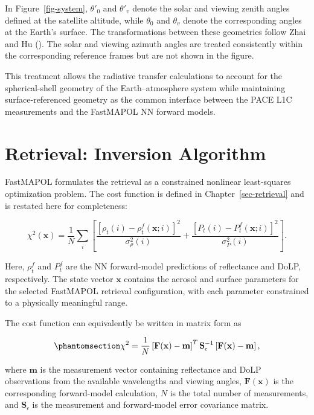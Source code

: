 \documentclass[
  11pt,
  letterpaper,
]{scrreprt}
\begin{document}
In Figure~\ref{fig-system}, \(\theta'_0\) and \(\theta'_v\) denote the
solar and viewing zenith angles defined at the satellite altitude, while
\(\theta_0\) and \(\theta_v\) denote the corresponding angles at the
Earth's surface. The transformations between these geometries follow
Zhai and Hu (). The solar and viewing
azimuth angles are treated consistently within the corresponding
reference frames but are not shown in the figure.

This treatment allows the radiative transfer calculations to account for
the spherical-shell geometry of the Earth--atmosphere system while
maintaining surface-referenced geometry as the common interface between
the PACE L1C measurements and the FastMAPOL NN forward models.

\chapter{Retrieval: Inversion Algorithm}\label{sec-retrieval-inversion}

FastMAPOL formulates the retrieval as a constrained nonlinear
least-squares optimization problem. The cost function is defined in
Chapter~\ref{sec-retrieval} and is restated here for completeness:

\[
\chi^2({\mathbf x})
=
\frac{1}{N}
\sum_i
\left[
\frac{[\rho_t(i)-\rho_t^f({\mathbf x};i)]^2}{\sigma_\rho^2(i)}
+
\frac{[P_t(i)-P_t^f({\mathbf x};i)]^2}{\sigma_P^2(i)}
\right].
\]

Here, \(\rho_t^f\) and \(P_t^f\) are the NN forward-model predictions of
reflectance and DoLP, respectively. The state vector \(\mathbf{x}\)
contains the aerosol and surface parameters for the selected FastMAPOL
retrieval configuration, with each parameter constrained to a physically
meaningful range.

The cost function can equivalently be written in matrix form as

\begin{equation}\phantomsection\label{eq-uq-cost}{
\chi^2
=
\frac{1}{N}
\left[
\mathbf{F}(\mathbf{x})-\mathbf{m}
\right]^T
\mathbf{S}_{\epsilon}^{-1}
\left[
\mathbf{F}(\mathbf{x})-\mathbf{m}
\right],
}\end{equation}

where \(\mathbf{m}\) is the measurement vector containing reflectance
and DoLP observations from the available wavelengths and viewing angles,
\(\mathbf{F}(\mathbf{x})\) is the corresponding forward-model
calculation, \(N\) is the total number of measurements, and
\(\mathbf{S}_{\epsilon}\) is the measurement and forward-model error
covariance matrix.
\end{document}
